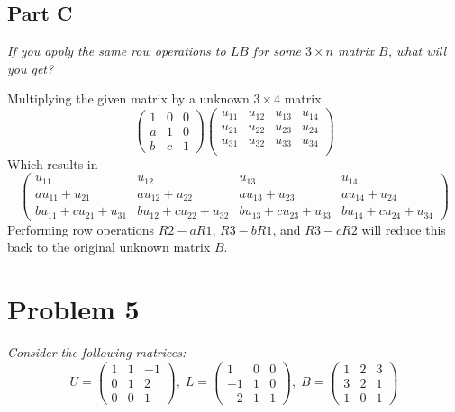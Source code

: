 \documentclass{article}
\begin{document}
\subsection*{Part C}

\textit{If you apply the same row operations to $LB$ for some $3\times n$
matrix $B$, what will you get?}

\bigbreak

Multiplying the given matrix by a unknown $ 3 \times 4 $ matrix
\[
    \begin{pmatrix}
        1 & 0 & 0 \\
        a & 1 & 0 \\
        b & c & 1
    \end{pmatrix}
    \begin{pmatrix}
        u_{11} & u_{12} & u_{13} & u_{14} \\
        u_{21} & u_{22} & u_{23} & u_{24} \\
        u_{31} & u_{32} & u_{33} & u_{34} \\
    \end{pmatrix}
\]
Which results in
\[
    \begin{pmatrix}
        u_{11} & u_{12} & u_{13} & u_{14} \\
        a u_{11} + u_{21} & a u_{12} + u_{22} & a u_{13} + u_{23} & a u_{14} + u_{24} \\
        b u_{11} + c u_{21} + u_{31} & b u_{12} + c u_{22} + u_{32} & b u_{13} + c u_{23} + u_{33} & b u_{14} + c u_{24} + u_{34}
    \end{pmatrix}
\]
Performing row operations $ R2 - a R1 $, $ R3 - b R1 $, and $ R3 - c R2 $ will
reduce this back to the original unknown matrix $ B $.

\section*{Problem 5}

\textit{Consider the following matrices:}
$$
U = \begin{pmatrix} 1 & 1 & -1 \\ 0 & 1 & 2 \\ 0 & 0 & 1 \end{pmatrix}, \;
L = \begin{pmatrix} 1 & 0 & 0 \\ -1 & 1 & 0 \\ -2 & 1 & 1 \end{pmatrix}, \;
B = \begin{pmatrix} 1 & 2 & 3 \\ 3 & 2 & 1 \\ 1 & 0 & 1 \end{pmatrix}
$$
\end{document}
